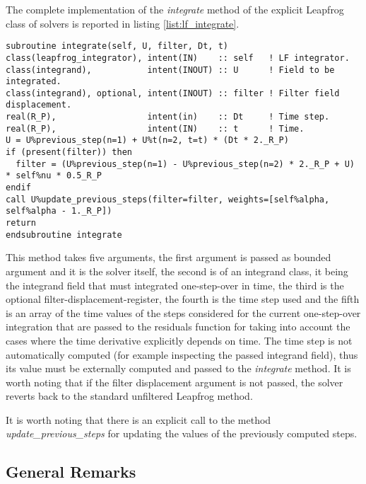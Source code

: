 \documentclass[pdftex,preprint,3p,times,numbers]{elsarticle}
\begin{document}
The complete implementation of the \emph{integrate} method of the explicit Leapfrog class of solvers is reported in listing \ref{list:lf_integrate}.

\begin{lstlisting}[firstnumber=1,style=code,caption={implementation of the \emph{integrate} method of explicit Leapfrog class},label={list:lf_integrate}]
subroutine integrate(self, U, filter, Dt, t)
class(leapfrog_integrator), intent(IN)    :: self   ! LF integrator.
class(integrand),           intent(INOUT) :: U      ! Field to be integrated.
class(integrand), optional, intent(INOUT) :: filter ! Filter field displacement.
real(R_P),                  intent(in)    :: Dt     ! Time step.
real(R_P),                  intent(IN)    :: t      ! Time.
U = U%previous_step(n=1) + U%t(n=2, t=t) * (Dt * 2._R_P)
if (present(filter)) then
  filter = (U%previous_step(n=1) - U%previous_step(n=2) * 2._R_P + U) * self%nu * 0.5_R_P
endif
call U%update_previous_steps(filter=filter, weights=[self%alpha, self%alpha - 1._R_P])
return
endsubroutine integrate
\end{lstlisting}

This method takes five arguments, the first argument is passed as bounded argument and it is the solver itself, the second is of an integrand class, it being the integrand field that must integrated one-step-over in time, the third is the optional filter-displacement-register, the fourth is the time step used and the fifth is an array of the time values of the steps considered for the current one-step-over integration that are passed to the residuals function for taking into account the cases where the time derivative explicitly depends on time. The time step is not automatically computed (for example inspecting the passed integrand field), thus its value must be externally computed and passed to the \emph{integrate} method. It is worth noting that if the filter displacement argument is not passed, the solver reverts back to the standard unfiltered Leapfrog method.

It is worth noting that there is an explicit call to the method \emph{update\_previous\_steps} for updating the values of the previously computed steps.

\subsection{General Remarks}\label{subsec:API-remarks}
\end{document}

